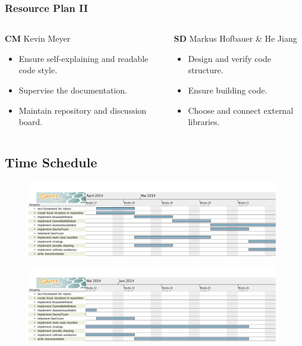 \documentclass[hyperref={pdfpagelabels=false},compress]{beamer}
\begin{document}
\begin{frame}
	\frametitle{Resource Plan II}
	\begin{columns}[t]
		\begin{column}{0.50\textwidth}
			\begin{block}{\textbf{CM} Kevin Meyer}
				\begin{itemize}
					\item Ensure self-explaining and readable code style.
					\item Supervise the documentation.
					\item Maintain repository and discussion board.
				\end{itemize}
			\end{block}
		\end{column}

		\begin{column}{0.50\textwidth}
			\begin{block}{\textbf{SD} Markus Hofbauer \& He Jiang}
				\begin{itemize}
					\item Design and verify code structure.
					\item Ensure building code.
					\item Choose and connect external libraries.
				\end{itemize}
			\end{block}
		\end{column}
	\end{columns}
\end{frame}

\subsection{Time Schedule}
\begin{frame}
	\begin{figure}
		\centering
		\includegraphics[width = 0.98\textwidth]{g1.pdf}
	\end{figure}
	\begin{figure}
		\centering
		\includegraphics[width = 0.98\textwidth]{g2.pdf}
	\end{figure}
\end{frame}
\end{document}
